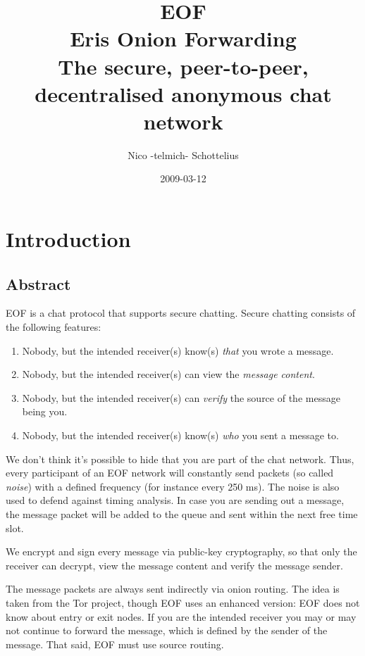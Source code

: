 \documentclass[12pt,a4paper]{book}
\begin{document}
\title{EOF\\Eris Onion Forwarding\\
The secure, peer-to-peer, decentralised anonymous chat network}
\date{2009-03-12}
\author{Nico -telmich- Schottelius}

\maketitle
\tableofcontents
\newpage

\chapter{Introduction}
\section{Abstract}
EOF is a chat protocol that supports secure chatting.
Secure chatting consists of the following features:
\begin{enumerate}
\item Nobody, but the intended receiver(s) know(s) \emph{that} you wrote a message.
\item Nobody, but the intended receiver(s) can view the \emph{message content}.
\item Nobody, but the intended receiver(s) can \emph{verify} the source of the message being you.
\item Nobody, but the intended receiver(s) know(s) \emph{who} you sent a message to.
\end{enumerate}
We don't think it's possible to hide that you are part of the chat network.
Thus, every participant of an EOF network will constantly send packets
(so called \emph{noise}) with a defined frequency (for instance every 250 ms).
The noise is also used to defend against timing analysis.
In case you are sending out a message, the message packet will be added to the
queue and sent within the next free time slot.

We encrypt and sign every message via public-key cryptography\cite{pgp-1},
so that only the receiver can decrypt, view the message content and verify
the message sender.

The message packets are always sent indirectly via onion routing\cite{onion-1}.
The idea is taken from the Tor project\cite{tor-1}, though EOF uses an enhanced
version: EOF does not know about entry or exit nodes. If you are the intended
receiver you may or may not continue to forward the message, which is defined
by the sender of the message. That said, EOF must use source
routing\cite{source-routing-1}.
\end{document}
